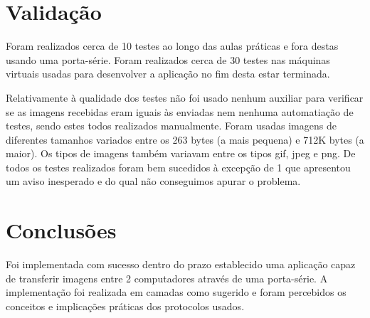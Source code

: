 \documentclass[11pt,a4paper,reqno]{report}
\numberwithin{equation}{section}
\begin{document}
\chapter{Validação}

Foram realizados cerca de 10 testes ao longo das aulas práticas e fora destas usando uma porta-série.
Foram realizados cerca de 30 testes nas máquinas virtuais usadas para desenvolver a aplicação no fim desta estar terminada.

Relativamente à qualidade dos testes não foi usado nenhum auxiliar para verificar se as imagens recebidas eram iguais às enviadas nem nenhuma automatiação de testes, sendo estes todos realizados manualmente. 
Foram usadas imagens de diferentes tamanhos variados entre os 263 bytes (a mais pequena) e 712K bytes (a maior). Os tipos de imagens também variavam entre os tipos gif, jpeg e png.
De todos os testes realizados foram bem sucedidos à excepção de 1 que apresentou um aviso inesperado e do qual não conseguimos apurar o problema.

\chapter{Conclusões}

Foi implementada com sucesso dentro do prazo establecido uma aplicação capaz de transferir imagens entre 2 computadores através de uma porta-série.
A implementação foi realizada em camadas como sugerido e foram percebidos os conceitos e implicações práticas dos protocolos usados.




\end{document}
